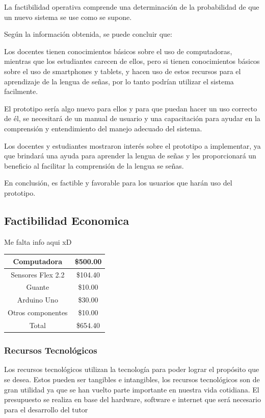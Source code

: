 \documentclass[12pt]{report}%
\begin{document}
La factibilidad operativa comprende una determinación de la probabilidad de que un nuevo sistema se use como se supone.

Según la información obtenida, se puede concluir que:

Los docentes tienen conocimientos básicos sobre el uso de computadoras, mientras que los estudiantes carecen de ellos, pero si tienen conocimientos básicos sobre el uso de smartphones y tablets, y hacen uso de estos recursos para el aprendizaje de la lengua de señas, por lo tanto podrían utilizar el sistema facilmente.

El prototipo sería algo nuevo para ellos y para que puedan hacer un uso correcto de él, se necesitará de un manual de usuario y una capacitación para ayudar en la comprensión y entendimiento del manejo adecuado del sistema.
 
Los docentes y estudiantes mostraron interés sobre el prototipo a implementar, ya que brindará una ayuda para aprender la lengua de señas y les proporcionará un beneficio al facilitar la comprensión de la lengua se señas.

En conclusión, es factible y favorable para los usuarios que harán uso del prototipo.




\newpage
\subsection{Factibilidad Economica}
Me falta info aqui xD

\begin{table}[htbp]
\begin{tabular}{|c|c|}
\hline
Computadora       & \$500.00 \\ \hline
Sensores Flex 2.2 & \$104.40 \\ \hline
Guante            & \$10.00  \\ \hline
Arduino Uno       & \$30.00  \\ \hline
Otros componentes & \$10.00  \\ \hline
Total             & \$654.40 \\ \hline
\end{tabular}
\end{table}



\subsubsection{Recursos Tecnológicos}
Los recursos tecnológicos utilizan la tecnología para poder lograr el propósito que se desea.
Estos pueden ser tangibles e intangibles, los recursos tecnológicos son de gran utilidad ya que se han vuelto parte importante en nuestra vida cotidiana. 
El presupuesto se realiza en base del hardware, software e internet que será necesario para el desarrollo del tutor 
\end{document}

